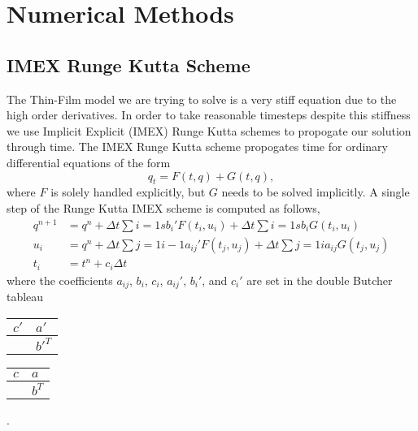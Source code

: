 
\chapter{Numerical Methods}
\section{IMEX Runge Kutta Scheme}\label{ssec:imex}
The Thin-Film model we are trying to solve is a very stiff equation due to the
high order derivatives.
In order to take reasonable timesteps despite this stiffness we use Implicit
Explicit (IMEX) Runge Kutta schemes to propogate our solution through time.
The IMEX Runge Kutta scheme propogates time for ordinary differential
equations of the form
\begin{equation}
  q_t = F(t, q) + G(t, q),
\end{equation}
where \(F\) is solely handled explicitly, but \(G\) needs to be solved implicitly.
A single step of the Runge Kutta IMEX scheme is computed as follows,
\begin{align}
  q^{n+1} &= q^n + \Delta t \sum{i = 1}{s}{b_i' F(t_i, u_i)} + \Delta t \sum{i=1}{s}{b_i G(t_i, u_i)} \\
  u_i &= q^n + \Delta t \sum{j = 1}{i-1}{a_{ij}' F(t_j, u_j)} + \Delta t \sum{j=1}{i}{a_{ij} G(t_j, u_j)} \\
  t_i &= t^n + c_i \Delta t
\end{align}
where the coefficients \(a_{ij}\), \(b_i\), \(c_i\), \(a_{ij}'\), \(b_i'\), and \(c_i'\)
are set in the double Butcher tableau
\begin{center}
  \begin{tabular}{r|l}
    \(c'\) & \(a'\) \\
    \midrule
      & \(b'^T\)
  \end{tabular}\hspace{0.5cm}
  \begin{tabular}{r|l}
    \(c\) & \(a\) \\
    \midrule
      & \(b^T\)
  \end{tabular}.
\end{center}

